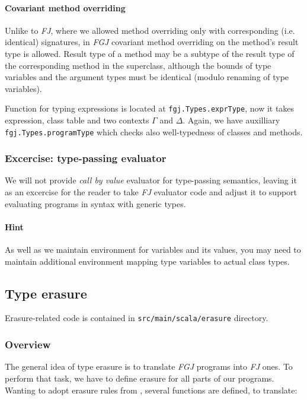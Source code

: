 \documentclass{article}[12pt]
\begin{document}
\paragraph{Covariant method overriding}

Unlike to \emph{FJ}, where we allowed method overriding only with
corresponding (i.e. identical) signatures, in \emph{FGJ} covariant
method overriding on the method's result type is allowed. Result
type of a method may be a subtype of the result type of the
corresponding method in the superclass, although the bounds of
type variables and the argument types must be identical (modulo
renaming of type variables).

Function for typing expressions is located at
\texttt{fgj.Types.exprType}, now it takes expression, class table
and two contexts $\Gamma$ and $\Delta$. Again, we have auxilliary
\texttt{fgj.Types.programType} which checks also well-typedness of
classes and methods.

\subsubsection{Excercise: type-passing evaluator}

We will not provide \emph{call by value} evaluator for type-passing
semantics, leaving it as an excercise for the reader to take
\emph{FJ} evaluator code and adjust it to support evaluating
programs in syntax with generic types.

\paragraph{Hint} As well as we maintain environment for variables
and its values, you may need to maintain additional environment
mapping type variables to actual class types.


\subsection{Type erasure}

Erasure-related code is contained in \texttt{src/main/scala/erasure}
directory.

\subsubsection{Overview}

The general idea of type erasure is to translate \emph{FGJ}
programs into \emph{FJ} ones. To perform that task, we have to
define erasure for all parts of our programs. Wanting to adopt
erasure rules from \cite{fj}, several functions are defined, to
translate:
\end{document}
